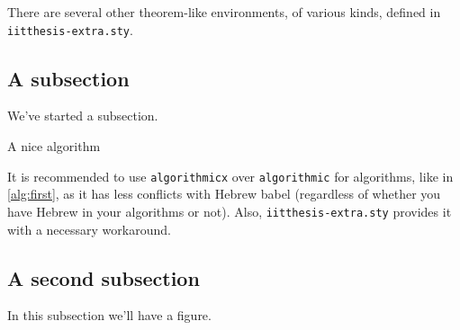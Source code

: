 There are several other theorem-like environments, of various kinds, defined in \texttt{iitthesis-extra.sty}.

\subsection{A subsection}

We've started a subsection.

\begin{algorithm}
\caption{A nice algorithm}
\label{alg:first}
\begin{algorithmic}[1]
\ENDFOR
{}
\end{algorithmic}
\end{algorithm}

It is recommended to use \texttt{algorithmicx} over \texttt{algorithmic} for algorithms, like in \autoref{alg:first}, as it has less conflicts with Hebrew babel (regardless of whether you have Hebrew in your algorithms or not). Also, \texttt{iitthesis-extra.sty} provides it with a necessary workaround.

\subsection{A second subsection}

In this subsection we'll have a figure.

